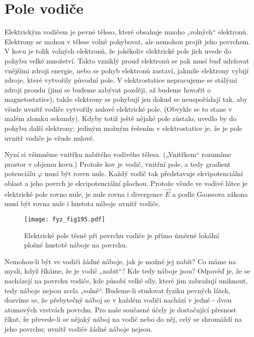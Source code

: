 \section{Pole vodiče}\label{fyz:IIchapVsecVIII}
  Elektrickým vodičem je pevné těleso, které obsahuje mnoho „volných“ elektronů. Elektrony se 
  mohou v tělese volně pohybovat, ale nemohou projít jeho povrchem. V kovu je tolik volných 
  elektronů, že jakékoliv elektrické pole jich uvede do pohybu velké množství. Takto vzniklý 
  proud elektronů se pak musí buď udržovat vnějšími zdroji energie, nebo se pohyb elektronů 
  zastaví, jakmile elektrony vybijí zdroje, které vytvořily původní pole. V elektrostatice 
  nepracujeme se stálými zdroji proudu (jimi se budeme zabývat později, až budeme hovořit o 
  magnetostatice), takže elektrony se pohybují jen dokud se neuspořádají tak, aby všude uvnitř 
  vodiče vytvořily nulové elektrické pole. (Obvykle se to stane v malém zlomku sekundy). Kdyby 
  totiž ještě nějaké pole zůstalo, uvedlo by do pohybu další elektrony; jediným možným řešením 
  v elektrostatice je, že je pole uvnitř vodiče je všude nulové.
  
  Nyní si všimněme vnitřku nabitého vodivého tělesa. („Vnitřkem“ rozumíme prostor v objemu 
  kovu.) Protože kov je vodič, vnitřní pole, a tedy gradient potenciálu \(\varphi\) musí být 
  roven nule. Každý vodič tak představuje ekvipotenciální oblast a jeho povrch je 
  ekvipotenciální plochou. Protože všude ve vodivé látce je elektrické pole rovno nule, je nule 
  rovna i divergence \(\vec{E}\) a podle Gaussova zákona musí být rovna nule i hustota náboje 
  uvnitř vodiče.

  \begin{figure}[ht!]  %
    \centering
    \texttt{[image: fyz\_fig195.pdf]}
    \caption{Elektrické pole těsně při povrchu vodiče je přímo úměrné lokální plošné hustotě  
             náboje na povrchu.}
    \label{fyz:fig195}
  \end{figure} 
  Nemohou-li být ve vodiči žádné náboje, jak je možné jej nabít? Co máme na mysli, když říkáme, 
  že je vodič „nabit“? Kde tedy náboje jsou? Odpověď je, že se nacházejí na povrchu vodiče, kde 
  působí velké síly, které jim zabraňují uniknout, tedy náboje nejsou zcela „volné“. Budeme-li 
  studovat fyziku pevných látek, dozvíme se, že přebytečný náboj se v každém vodiči nachází v 
  jedné - dvou atomových vrstvách povrchu. Pro naše současné účely je dostačující přesnost 
  říkat, že převede-li se nějaký náboj na vodič nebo do něj, celý se shromáždí na jeho povrchu; 
  uvnitř vodiče žádné náboje nejsou. 
  
